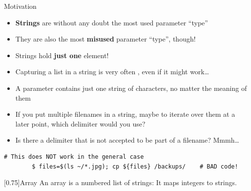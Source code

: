 
\begin{frame}[fragile]{Motivation}
    \vspace{-1mm}
    \begin{itemize}
        \item \textbf{Strings} are without any doubt the most used parameter ``type''
        \item They are also the most \textbf{misused} parameter ``type'', though!
        \item Strings hold \alert{\textbf{just one}} element!
        \item Capturing a list in a string is very often , even if it might work\ldots
        \item A parameter contains just one string of characters, no matter the meaning of them
        \item If you put multiple filenames in a string, maybe to iterate over them at a later point, which delimiter would you use?
        \item Is there a delimiter that is not accepted to be part of a filename? Mmmh\ldots
    \end{itemize}
    \begin{lstlisting}[style=MyBash, numbers=none]
        # This does NOT work in the general case
        $ files=$(ls ~/*.jpg); cp ${files} /backups/    # BAD code!
    \end{lstlisting}
    \begin{varblock}{}[0.75\textwidth]{Array}
        An array is a numbered list of strings: It maps integers to strings.
    \end{varblock}
\end{frame}
